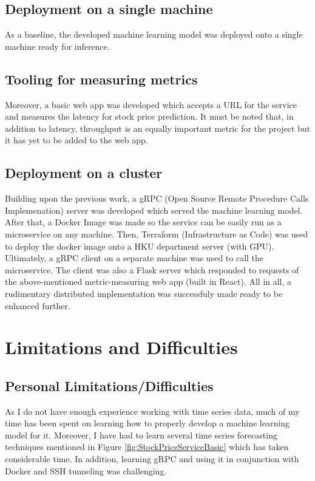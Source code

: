 \documentclass{report}
\begin{document}
\section{Deployment on a single machine}

As a baseline, the developed machine learning model was deployed onto a single machine ready for inference.

\section{Tooling for measuring metrics}

Moreover, a basic web app was developed which accepts a URL for the service and measures the latency for stock price prediction. It must be noted that, in addition to latency, throughput is an equally important metric for the project but it has yet to be added to the web app.

\section{Deployment on a cluster}

Building upon the previous work, a gRPC (Open Source Remote Procedure Calls Implemenation) server was developed which served the machine learning model. After that, a Docker Image was made so the service can be easily run as a microservice on any machine. Then, Terraform (Infrastructure as Code) was used to deploy the docker image onto a HKU department server (with GPU). Ultimately, a gRPC client on a separate machine was used to call the microservice. The client was also a Flask server which responded to requests of the above-mentioned metric-measuring web app (built in React). All in all, a rudimentary distributed implementation was successfuly made ready to be enhanced further.

\chapter{Limitations and Difficulties}\label{chap:limitations}
\section{Personal Limitations/Difficulties}
As I do not have enough experience working with time series data, much of my time has been spent on learning how to properly develop a machine learning model for it. Moreover, I have had to learn several time series forecasting techniques mentioned in Figure \ref{fig:StockPriceServiceBasic} which has taken considerable time. In addition, learning gRPC and using it in conjunction with Docker and SSH tunneling was challenging. 
\end{document}
